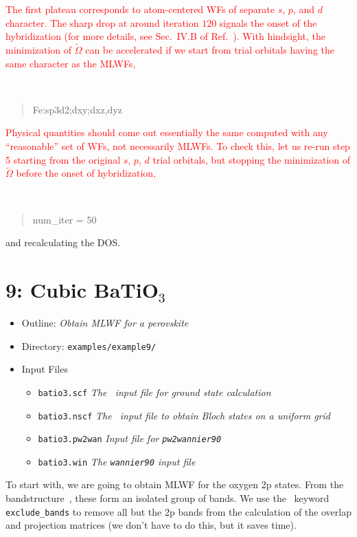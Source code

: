 \documentclass[a4paper,11pt,twoside]{article}
\def\tent#1{\textcolor{red}{#1}}     %
\begin{document}
\tent{The first plateau corresponds to atom-centered WFs of separate
  $s$, $p$, and $d$ character. The sharp drop at around iteration
  $120$ signals the onset of the hybridization (for more details, see
  Sec.~IV.B of Ref.~\cite{wang-prb06}).  With hindsight, the
  minimization of $\widetilde{\Omega}$ can be accelerated if we start
  from trial orbitals having the same character as the MLWFs,} {\tt
\begin{quote}
Fe:sp3d2;dxy;dxz,dyz
\end{quote}
}


\tent{Physical quantities should come out essentially the same
  computed with any ``reasonable'' set of WFs, not necessarily MLWFs.
  To check this, let us re-run step 5 starting from the original $s$,
  $p$, $d$ trial orbitals, but stopping the minimization of
  $\widetilde{\Omega}$ before the onset of hybridization,} 
{\tt
\begin{quote}
num\_iter = 50
\end{quote}
}

and recalculating the DOS.



\cleardoublepage


\section*{9: Cubic BaTiO$_3$}
\begin{itemize}
\item{Outline: \it{Obtain MLWF for a perovskite}}
\item{Directory: {\tt examples/example9/}}
\item{Input Files}
\begin{itemize}
\item{ {\tt batio3.scf}  {\it The \pwscf\ input file for ground state
    calculation}} 
\item{ {\tt batio3.nscf}  {\it The \pwscf\ input file to obtain Bloch states
    on a uniform grid}} 
\item{ {\tt batio3.pw2wan}  {\it Input file for {\tt pw2wannier90}}}
\item{ {\tt  batio3.win}  {\it The {\tt wannier90} input file}}
\end{itemize}
\end{itemize}

 To start with, we are going to obtain MLWF for the oxygen 2p
  states. From the bandstructure~\cite{BaTiO3}, these form an isolated
  group of bands. We use the \wannier\ keyword {\tt exclude\_bands} to
  remove all but the 2p bands from the calculation of the overlap
  and projection matrices (we don't have to do this, but it saves time).
\end{document}
